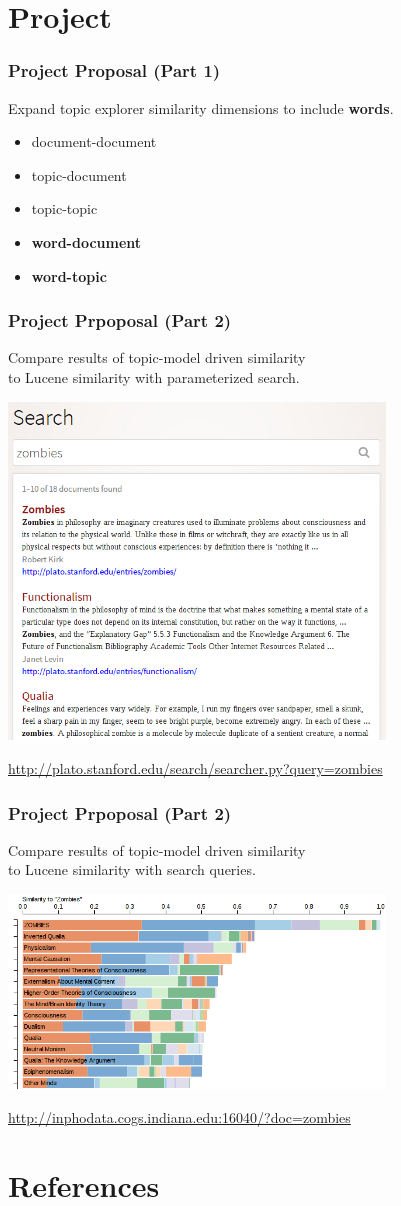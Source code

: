 \documentclass[t]{beamer}
\begin{document}
\section{Project}
\begin{frame}
\frametitle{Project Proposal (Part 1)}
Expand topic explorer similarity dimensions to include \textbf{words}.
\begin{itemize}
\item document-document
\item topic-document
\item topic-topic
\item \textbf{word-document}
\item \textbf{word-topic}
\end{itemize}
\end{frame}

\begin{frame}
\frametitle{Project Prpoposal (Part 2)}
Compare results of topic-model driven similarity\\
to Lucene similarity with parameterized search.

\includegraphics[width=0.75\textwidth]{img/zombie-lucene.png}

\url{http://plato.stanford.edu/search/searcher.py?query=zombies}
\end{frame}

\begin{frame}
\frametitle{Project Prpoposal (Part 2)}
Compare results of topic-model driven similarity\\
to Lucene similarity with search queries.

\includegraphics[width=0.75\textwidth]{img/topex-zombies.png}

\url{http://inphodata.cogs.indiana.edu:16040/?doc=zombies}
\end{frame}

\section{References}
\begin{frame}
\tiny


\end{frame}

\frame{\titlepage}
\end{document}
